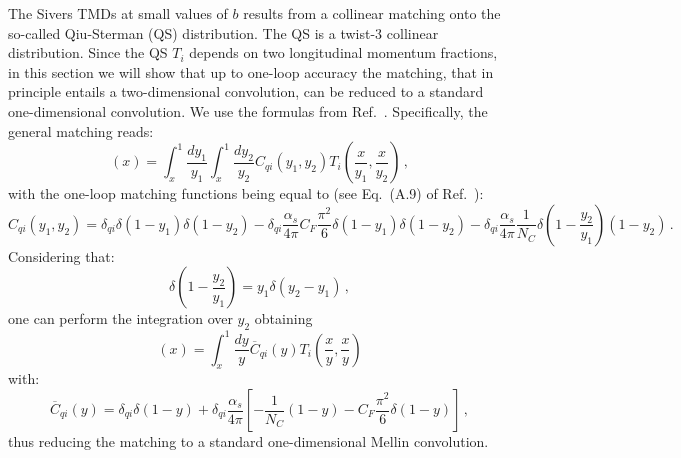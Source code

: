 \documentclass[10pt,a4paper]{article}
\begin{document}
The Sivers TMDs at small values of $b$ results from a collinear
matching onto the so-called Qiu-Sterman (QS) distribution. The QS is a
twist-3 collinear distribution. Since the QS $T_i$ depends on two
longitudinal momentum fractions, in this section we will show that up
to one-loop accuracy the matching, that in principle entails a
two-dimensional convolution, can be reduced to a standard
one-dimensional convolution. We use the formulas from
Ref.~\cite{Echevarria:2020hpy}. Specifically, the general matching
reads:
\begin{equation}
[C_{qi}\otimes T_{i}](x) =
\int_x^1\frac{dy_1}{y_1}\int_x^1\frac{dy_2}{y_2} C_{qi}\left(y_1,y_2\right)T_i\left(\frac{x}{y_1}, \frac{x}{y_2}\right)\,,
\end{equation}
with the one-loop matching functions being equal to (see Eq.~(A.9) of
Ref.~\cite{Echevarria:2020hpy}):
\begin{equation}
C_{qi}\left(y_1,y_2\right) = \delta_{qi}\delta(1-y_1)
\delta(1-y_2)-\delta_{qi}\frac{\alpha_s}{4\pi}C_F\frac{\pi^2}{6}\delta(1-y_1)
\delta(1-y_2)-\delta_{qi}\frac{\alpha_s}{4\pi}\frac{1}{N_C}\delta\left(1-\frac{y_2}{y_1}\right)(1-y_2)\,.
\label{eq:QSmatching}
\end{equation}
Considering that:
\begin{equation}
\delta\left(1-\frac{y_2}{y_1}\right) = y_1\delta(y_2-y_1)\,,
\end{equation}
one can perform the integration over $y_2$ obtaining
\begin{equation}
  [C_{qi}\otimes T_{i}](x) =
  \int_x^1\frac{dy}{y}\overline{C}_{qi}(y)T_i\left(\frac{x}{y}, \frac{x}{y}\right)
\end{equation}
with:
\begin{equation}
  \overline{C}_{qi}(y) = \delta_{qi}\delta(1-y)
+\delta_{qi}\frac{\alpha_s}{4\pi}\left[ -\frac{1}{N_C}(1-y) -C_F\frac{\pi^2}{6}\delta(1-y)\right]\,,
\end{equation}
thus reducing the matching to a standard one-dimensional Mellin
convolution.

\newpage


\end{document}

